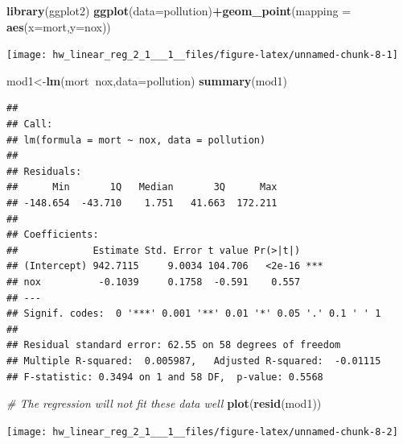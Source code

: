 \documentclass[]{article}
\newenvironment{Shaded}{\begin{snugshade}}{\end{snugshade}}
\newcommand{\KeywordTok}[1]{\textcolor[rgb]{0.13,0.29,0.53}{\textbf{#1}}}
\newcommand{\DataTypeTok}[1]{\textcolor[rgb]{0.13,0.29,0.53}{#1}}
\newcommand{\CommentTok}[1]{\textcolor[rgb]{0.56,0.35,0.01}{\textit{#1}}}
\newcommand{\OperatorTok}[1]{\textcolor[rgb]{0.81,0.36,0.00}{\textbf{#1}}}
\newcommand{\NormalTok}[1]{#1}
\begin{document}
\begin{Shaded}
\begin{Highlighting}[]
\KeywordTok{library}\NormalTok{(ggplot2)}
\KeywordTok{ggplot}\NormalTok{(}\DataTypeTok{data=}\NormalTok{pollution)}\OperatorTok{+}\KeywordTok{geom_point}\NormalTok{(}\DataTypeTok{mapping =} \KeywordTok{aes}\NormalTok{(}\DataTypeTok{x=}\NormalTok{mort,}\DataTypeTok{y=}\NormalTok{nox))}
\end{Highlighting}
\end{Shaded}

\begin{center}\texttt{[image: hw\_linear\_reg\_2\_1\_\_\_1\_\_files/figure-latex/unnamed-chunk-8-1]} \end{center}

\begin{Shaded}
\begin{Highlighting}[]
\NormalTok{mod1<-}\KeywordTok{lm}\NormalTok{(mort}\OperatorTok{~}\NormalTok{nox,}\DataTypeTok{data=}\NormalTok{pollution)}
\KeywordTok{summary}\NormalTok{(mod1)}
\end{Highlighting}
\end{Shaded}

\begin{verbatim}
## 
## Call:
## lm(formula = mort ~ nox, data = pollution)
## 
## Residuals:
##      Min       1Q   Median       3Q      Max 
## -148.654  -43.710    1.751   41.663  172.211 
## 
## Coefficients:
##             Estimate Std. Error t value Pr(>|t|)    
## (Intercept) 942.7115     9.0034 104.706   <2e-16 ***
## nox          -0.1039     0.1758  -0.591    0.557    
## ---
## Signif. codes:  0 '***' 0.001 '**' 0.01 '*' 0.05 '.' 0.1 ' ' 1
## 
## Residual standard error: 62.55 on 58 degrees of freedom
## Multiple R-squared:  0.005987,   Adjusted R-squared:  -0.01115 
## F-statistic: 0.3494 on 1 and 58 DF,  p-value: 0.5568
\end{verbatim}

\begin{Shaded}
\begin{Highlighting}[]
\CommentTok{# The regression will not fit these data well}
\KeywordTok{plot}\NormalTok{(}\KeywordTok{resid}\NormalTok{(mod1))}
\end{Highlighting}
\end{Shaded}

\begin{center}\texttt{[image: hw\_linear\_reg\_2\_1\_\_\_1\_\_files/figure-latex/unnamed-chunk-8-2]} \end{center}
\end{document}

